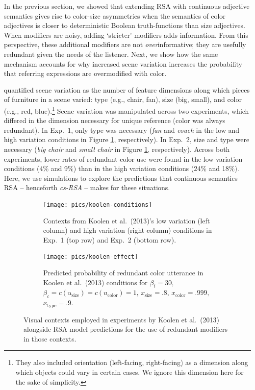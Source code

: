 \documentclass[11pt]{article}
\newcommand{\figref}[1]{Figure \ref{#1}}
\begin{document}
In the previous section, we showed that extending RSA with continuous adjective semantics gives rise to color-size asymmetries when the semantics of color adjectives is closer to deterministic Boolean truth-functions than size adjectives. When modifiers are noisy, adding `stricter' modifiers adds information. From this perspective, these additional modifiers are not \emph{over}informative; they are usefully redundant given the needs of the listener. 
Next, we show how the same mechanism accounts for why increased scene variation increases the probability that referring expressions are overmodified with color. 

  quantified scene variation as the number of feature dimensions along which pieces of furniture in a scene varied: type (e.g., chair, fan), size (big, small), and color (e.g., red, blue).\footnote{They also included orientation (left-facing, right-facing) as a dimension along which objects could vary in certain cases. We ignore this dimension here for the sake of simplicity.} 
Scene variation was manipulated across two experiments, which differed in the dimension necessary for unique reference (color was always redundant). 
In Exp.~1, only type was necessary (\emph{fan} and \emph{couch} in the low and high variation conditions in \figref{fig:koolencontexts}, respectively). 
In Exp.~2, size and type were necessary (\emph{big chair} and \emph{small chair} in \figref{fig:koolencontexts}, respectively). 
Across both experiments, lower rates of redundant color use were found in the low variation conditions (4\% and 9\%) than in the high variation conditions (24\% and 18\%).
Here, we use simulations to explore the predictions that continuous semantics RSA  -- henceforth \emph{cs-RSA} -- makes for these situations. 


\begin{figure}
\begin{subfigure}{.5\textwidth}
\texttt{[image: pics/koolen-conditions]}
\caption{Contexts from Koolen et al.~(2013)'s low variation (left column) and high variation (right column) conditions in Exp.~1 (top row) and Exp.~2 (bottom row).}
\label{fig:koolencontexts}
\end{subfigure}
\begin{subfigure}{.5\textwidth}
\centering
\texttt{[image: pics/koolen-effect]}
\caption{Predicted probability of redundant color utterance in Koolen et al.~(2013) conditions for $\beta_i = 30$, $ \beta_c = c(u_{\textrm{size}}) = c(u_{\textrm{color}}) = 1$, $x_{\text{size}} = .8$, $x_{\text{color}} = .999$, $x_{\text{type}} = .9$.}
\label{fig:koolensimulationresults}
\end{subfigure}
\caption{Visual contexts employed in experiments by Koolen et al.~(2013) alongside RSA model predictions for the use of redundant modifiers in those contexts.}
\end{figure}
\end{document}
